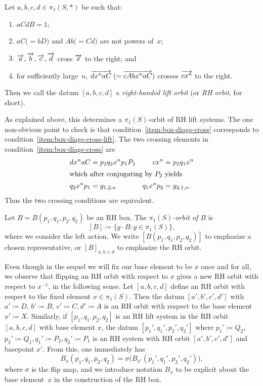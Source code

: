 \begin{definition}[RH orbit]
\label{def:RH-lift-sys}
Let $a,b,c,d \in \pi_1(S,\ast)$ be such that:
\begin{enumerate}[label=(\arabic*${}'$),start=0]
\item\label{item:box-close} $a C d B = 1$;
\item\label{item:box-nontriv} $aC\mathrel{(=}bD)$ and $Ab\mathrel{(=}Cd)$ are not powers of~$x$;
\item\label{item:box-edges-cross} $\overrightarrow{a},\overrightarrow{b},\overrightarrow{c},\overrightarrow{d}$ cross $\overrightarrow{x}$ to the right; and
\item\label{item:box-diags-cross} for sufficiently large~$n$, $\overrightarrow{dx^na C}
  \mathrel{(=} \overrightarrow{cAbx^na C})$ crosses $\overrightarrow{cx^n}$ to the right.
\end{enumerate}

Then we call the datum $[a,b,c,d]$ a \emph{right-handed lift orbit} (or \emph{RH orbit}, for short).
\end{definition}

As explained above, this determines a $\pi_1(S)$-orbit of RH lift systems.
The one non-obvious point to check is that
condition~\ref{item:box-diags-cross} corresponds
to condition~\ref{item:box-diags-cross-lift}. The two crossing
elements in condition~\ref{item:box-diags-cross} are
\begin{align*}
   dx^naC &= p_2 q_2 x^n p_1 P_2 & cx^n &= p_2 q_1 x^n\\
  \intertext{which after conjugating by $P_2$ yields}
  q_2 x^n p_1 &= g_{1,2,n} & q_1 x^n p_2 &= g_{2,1,n}.
\end{align*}
Thus the two crossing conditions are equivalent.

\begin{definition}
  Let $B = B(p_1,q_1,p_2,q_2)$ be an RH box. The \emph{$\pi_1(S)$-orbit of $B$} is
  \[
    [B] \coloneqq \{ g \cdot B \colon g \in \pi_1(S) \},
  \]
  where we consider the left action. We write $[B(p_1,q_1,p_2,q_2)]$ to emphasize a chosen representative, or $[B]_{a,b,c,d}$ to emphasize the RH orbit.
\end{definition}

\begin{remark}\label{rmk:flip_rh_box}
Even though in the sequel we will fix our base element to be $x$ once and for all, we observe that flipping an RH orbit with respect to $x$ gives a new RH orbit with respect to $x^{-1}$, in the following sense.
Let $[a,b,c,d]$ define an RH orbit with respect to the fixed element $x \in \pi_1(S)$.
Then the datum $[a', b', c', d']$ with $a' \coloneqq D$, $b' \coloneqq B$, $c'\coloneqq C, d'\coloneqq A$ is an RH orbit with respect to the base element $x' \coloneqq X$. Similarly, if $[p_1,q_1,p_2,q_2]$ is an RH lift system in the RH orbit $[a,b,c,d]$ with base element $x$, the datum $[p_1',q_1',p_2',q_2']$
where $p_1' \coloneqq Q_2$, $p_2' \coloneqq Q_1, q_1' \coloneqq P_2, q_2' \coloneqq P_1$
is an RH system with RH orbit $[a',b',c',d']$ and basepoint $x'$.
From this, one immediately has
\[B_x(p_1,q_1,p_2,q_2)=\sigma\bigl(B_{x'}(p_1',q_1',p_2',q_2')\bigr),\]
where $\sigma$ is the flip map, and we introduce notation $B_x$ to be
explicit about the
base element~$x$ in the construction of the RH box.
\end{remark}

